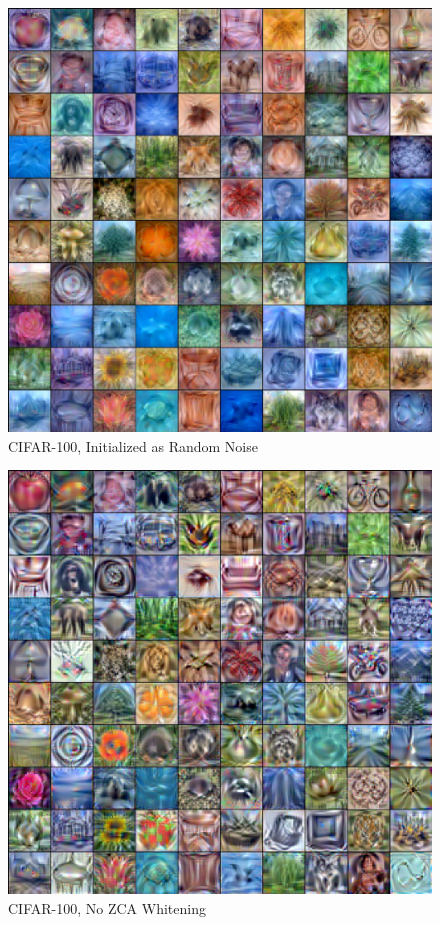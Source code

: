 \begin{figure}
    \centering
    \includegraphics[width=\linewidth]{figures/cifar100-noise.pdf}
    \caption{CIFAR-100, Initialized as Random Noise}
    \label{fig:noise}
\end{figure}
\begin{figure}
    \centering
    \includegraphics[width=\linewidth]{figures/cifar100-nozca.pdf}
    \caption{CIFAR-100, No ZCA Whitening}
    \label{fig:nozca}
\end{figure}
